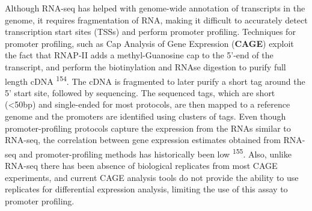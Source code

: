 \documentclass[11pt,twoside]{MPIthesis}
\theoremstyle{definition}
\theoremstyle{definition}
\theoremstyle{definition}
\theoremstyle{remark}
\begin{document}
Although RNA-seq has helped with genome-wide annotation of transcripts
in the genome, it requires fragmentation of RNA, making it difficult to
accurately detect transcription start sites (TSSs) and perform promoter
profiling. Techniques for promoter profiling, such as Cap Analysis of
Gene Expression (\textbf{CAGE}) exploit the fact that RNAP-II adds a
methyl-Guanosine cap to the 5'-end of the transcript, and perform the
biotinylation and RNAse digestion to purify full length cDNA
\textsuperscript{154}. The cDNA is fragmented to later purify a short
tag around the 5' start site, followed by sequencing. The sequenced
tags, which are short (\textless{}50bp) and single-ended for most
protocols, are then mapped to a reference genome and the promoters are
identified using clusters of tags. Even though promoter-profiling
protocols capture the expression from the RNAs similar to RNA-seq, the
correlation between gene expression estimates obtained from RNA-seq and
promoter-profiling methods has historically been low
\textsuperscript{155}. Also, unlike RNA-seq there has been absence of
biological replicates from most CAGE experiments, and current CAGE
analysis tools do not provide the ability to use replicates for
differential expression analysis, limiting the use of this assay to
promoter profiling.
\end{document}
